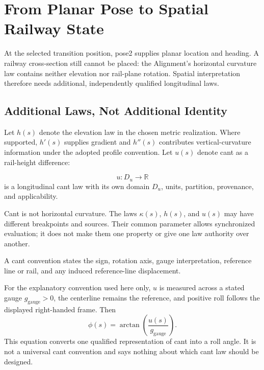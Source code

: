 \chapter{From Planar Pose to Spatial Railway State}
\label{chap:pose3-and-cant}

At the selected transition position, pose2 supplies planar location and
heading. A railway cross-section still cannot be placed: the Alignment's
horizontal curvature law contains neither elevation nor rail-plane rotation.
Spatial interpretation therefore needs additional, independently qualified
longitudinal laws.

\section{Additional Laws, Not Additional Identity}

Let \(h(s)\) denote the elevation law in the chosen metric realization.
Where supported, \(h'(s)\) supplies gradient and \(h''(s)\) contributes
vertical-curvature information under the adopted profile convention. Let
\(u(s)\) denote cant as a rail-height difference:

\begin{definition}
\label{def:cant-height-difference}
\[
u\colon D_u\rightarrow \mathbb R
\]
is a longitudinal cant law with its own domain \(D_u\), units, partition,
provenance, and applicability.
\end{definition}

Cant is not horizontal curvature. The laws \(\kappa(s)\), \(h(s)\), and
\(u(s)\) may have different breakpoints and sources. Their common parameter
allows synchronized evaluation; it does not make them one property or give
one law authority over another.

\begin{definition}
\label{def:cant-reference-convention}
A cant convention states the sign, rotation axis, gauge interpretation,
reference line or rail, and any induced reference-line displacement.
\end{definition}

For the explanatory convention used here only, \(u\) is measured across a
stated gauge \(g_{\mathrm{gauge}}>0\), the centerline remains the reference,
and positive roll follows the displayed right-handed frame. Then
\begin{equation}
\phi(s)=
\arctan\!\left(\frac{u(s)}{g_{\mathrm{gauge}}}\right).
\label{eq:derived-roll-angle}
\end{equation}
This equation converts one qualified representation of cant into a roll
angle. It is not a universal cant convention and says nothing about which
cant law should be designed.

